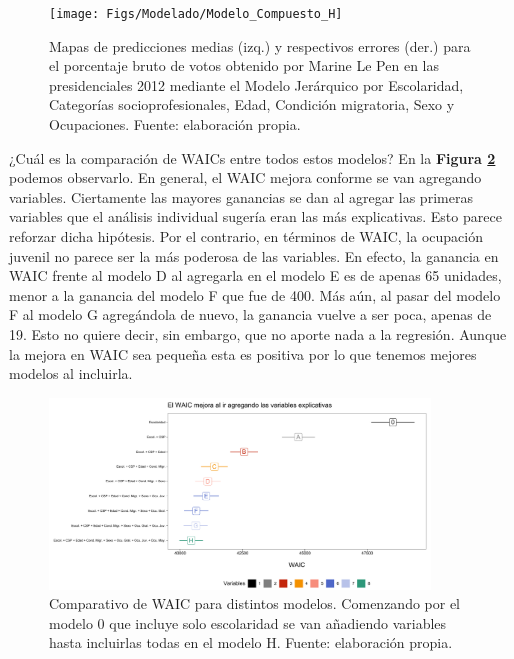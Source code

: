 \begin{figure}
	\centering
	\texttt{[image: Figs/Modelado/Modelo\_Compuesto\_H]}
	\caption{Mapas de predicciones medias (izq.) y respectivos errores (der.) para el porcentaje bruto de votos obtenido por Marine Le Pen en las presidenciales 2012 mediante el Modelo Jerárquico por Escolaridad, Categorías socioprofesionales, Edad, Condición migratoria, Sexo y Ocupaciones. Fuente: elaboración propia.}
	\label{fig:Modelo_Compuesto_H}
\end{figure}

¿Cuál es la comparación de WAICs entre todos estos modelos? En la \textbf{Figura \ref{fig:Compara_WAIC_Compuestos}} podemos observarlo. En general, el WAIC mejora conforme se van agregando variables. Ciertamente las mayores ganancias se dan al agregar las primeras variables que el análisis individual sugería eran las más explicativas. Esto parece reforzar dicha hipótesis. Por el contrario, en términos de WAIC, la ocupación juvenil no parece ser la más poderosa de las variables. En efecto, la ganancia en WAIC frente al modelo D al agregarla en el modelo E es de apenas 65 unidades, menor a la ganancia del modelo F que fue de 400. Más aún, al pasar del modelo F al modelo G agregándola de nuevo, la ganancia vuelve a ser poca, apenas de 19. Esto no quiere decir, sin embargo, que no aporte nada a la regresión. Aunque la mejora en WAIC sea pequeña esta es positiva por lo que tenemos mejores modelos al incluirla.\\

\begin{figure}
	\centering
	\includegraphics[width = 0.9\textwidth]{Figs/Modelado/Graf_WAIC_Modelos_Compuestos}
	\caption{Comparativo de WAIC para distintos modelos. Comenzando por el modelo 0 que incluye solo escolaridad se van añadiendo variables hasta incluirlas todas en el modelo H. Fuente: elaboración propia.}
	\label{fig:Compara_WAIC_Compuestos}
\end{figure}

